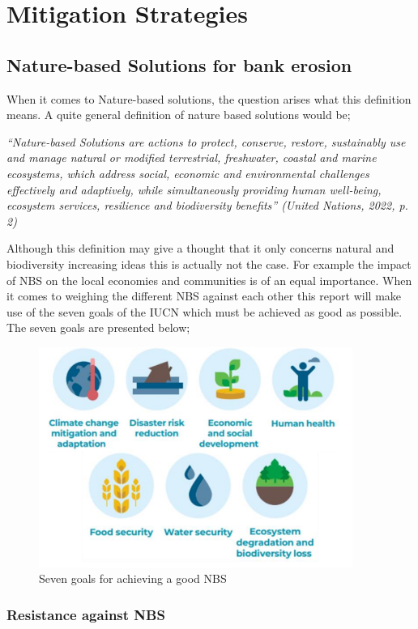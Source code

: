 \chapter{Mitigation Strategies}
\label{chap:mitigationstrats}

\section{Nature-based Solutions for bank erosion}

When it comes to Nature-based solutions, the question arises what this definition means. A quite general definition of nature based solutions would be;

\textit{“Nature-based Solutions are actions to protect, conserve, restore, sustainably
use and manage natural or modified terrestrial, freshwater, coastal and marine
ecosystems, which address social, economic and environmental challenges
effectively and adaptively, while simultaneously providing human well-being,
ecosystem services, resilience and biodiversity benefits” (United Nations, 2022,
p. 2)}

Although this definition may give a thought that it only concerns natural and biodiversity increasing ideas this is actually not the case. For example the impact of NBS on the local economies and communities is of an equal importance. When it comes to weighing the different NBS against each other this report will make use of the seven goals of the IUCN which must be achieved as good as possible. The seven goals are presented below;

\begin{figure}[H]
    \centering
    \includegraphics[width=0.50\linewidth]{figures/ThesevenNBSgoals.png}
    \caption{Seven goals for achieving a good NBS}
    \label{fig:placeholder}
\end{figure}

\subsection{Resistance against NBS}

